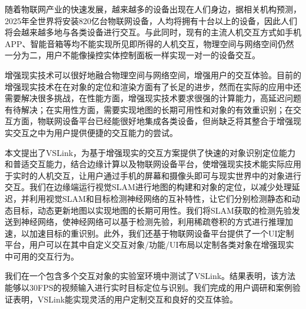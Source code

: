 \cleardoublepage
{}

随着物联网产业的快速发展，越来越多的设备出现在人们身边，据相关机构预测，2025年全世界将安装820亿台物联网设备，人均将拥有十台以上的设备，因此人们将会越来越多地与各类设备进行交互。与此同时，现有的主流人机交互方式如手机APP、智能音箱等均不能实现所见即所得的人机交互，物理空间与网络空间仍然一分为二，用户不能像操控实体控制面板一样实现一对一的设备交互。

增强现实技术可以很好地融合物理空间与网络空间，增强用户的交互体验。目前的增强现实技术在在对象的定位和渲染方面有了长足的进步，然而在实际的应用中还需要解决很多挑战，在性能方面，增强现实技术要求很强的计算能力，高延迟问题有待解决；在实用性方面，需要实现地图的长期可用性和对象的有效重识别；在交互方面，物联网设备平台已经能很好地集成各类设备，但尚缺乏将其整合于增强现实交互之中为用户提供便捷的交互能力的尝试。

本文提出了VSLink，为基于增强现实的交互方案提供了快速的对象识别定位能力和普适交互能力，结合边缘计算以及物联网设备平台，使增强现实技术能实际应用于实时的人机交互，让用户通过手机的屏幕和摄像头即可与现实世界中的对象进行交互。我们在边缘端运行视觉SLAM进行地图的构建和对象的定位，以减少处理延迟，并利用视觉SLAM和目标检测神经网络的互补特性，让它们分别检测静态和动态目标，动态更新地图以实现地图的长期可用性。我们将SLAM获取的检测先验发送到神经网络，使神经网络可以基于检测先验，利用稀疏卷积的方式进行推理加速，以加速目标的重识别。此外，我们还基于物联网设备平台提供了一个UI定制平台，用户可以在其中自定义交互对象/功能/UI布局以定制各类对象在增强现实中可用的交互行为。

我们在一个包含多个交互对象的实验室环境中测试了VSLink。结果表明，该方法能够以30FPS的视频输入进行实时目标定位与识别。我们完成的用户调研和案例验证表明，VSLink能实现灵活的用户定制交互和良好的交互体验。



